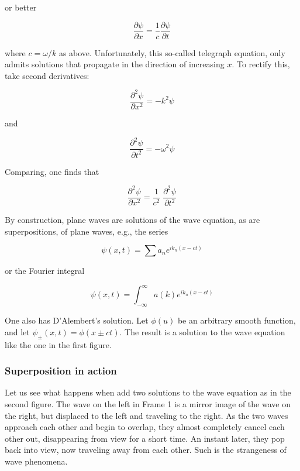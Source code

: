 or better

\begin{equation}
\frac{\partial\psi}{\partial x} = \frac{1}{c} \frac{\partial\psi}{\partial t} 
\end{equation}

where $c = \omega/k$ as above.  Unfortunately, this so-called telegraph equation, only admits solutions that propagate in the direction of increasing $x$.  To rectify this, take second derivatives:

\begin{equation}
\frac{\partial^2 \psi}{\partial x^2} = - k^2 \psi
\end{equation}

and 

\begin{equation}
\frac{\partial^2 \psi}{\partial t^2} = - \omega^2 \psi
\end{equation}

Comparing, one finds that

\begin{equation}
\frac{\partial^2 \psi}{\partial x^2} = \frac{1}{c^2} \;\frac{\partial^2 \psi}{\partial t^2}
\end{equation}

By construction, plane waves are solutions of the wave equation, as are superpositions, of plane waves, e.g., the series

\begin{equation}
\psi(x,t) = \sum a_n e^{ik_n(x - ct)}
\end{equation}

or the Fourier integral

\begin{equation}
\psi(x,t) = \int_{-\infty}^\infty a(k)e^{ik_n(x - ct)}
\end{equation}

One also has D'Alembert's solution.  Let $\phi(u)$ be an arbitrary smooth function, and let $\psi_{\pm}(x,t)  = \phi(x \pm ct)$.  The result is a solution to the wave equation like the one in the first figure.

\subsubsection{Superposition in action}


Let us see what happens when add two solutions to the wave equation as in the second figure.  The wave on the left in Frame 1 is a mirror image of the wave on the right, but displaced to the left and traveling to the right.  As the two waves approach each other and  begin to overlap, they almost completely cancel each other out, disappearing from view for a short time.  An instant later, they pop back into view, now traveling away from each other.   Such is the strangeness of wave phenomena. 

